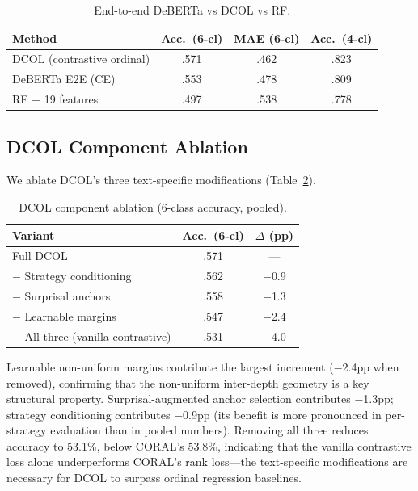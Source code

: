 \documentclass[11pt,a4paper]{article}
\begin{document}
\begin{table}[t]
\centering
\small
\caption{End-to-end DeBERTa vs DCOL vs RF.}
\label{tab:e2e}
\begin{tabular}{@{}lccc@{}}
\toprule
\textbf{Method} & \textbf{Acc.\ (6-cl)} & \textbf{MAE (6-cl)} & \textbf{Acc.\ (4-cl)} \\
\midrule
DCOL (contrastive ordinal) & .571 & .462 & .823 \\
DeBERTa E2E (CE) & .553 & .478 & .809 \\
RF + 19 features & .497 & .538 & .778 \\
\bottomrule
\end{tabular}
\end{table}

\subsection{DCOL Component Ablation}
\label{sec:ablation}

We ablate DCOL's three text-specific modifications (Table~\ref{tab:ablation}).

\begin{table}[t]
\centering
\small
\caption{DCOL component ablation (6-class accuracy, pooled).}
\label{tab:ablation}
\begin{tabular}{@{}lcc@{}}
\toprule
\textbf{Variant} & \textbf{Acc.\ (6-cl)} & \textbf{$\Delta$ (pp)} \\
\midrule
Full DCOL & .571 & --- \\
$-$ Strategy conditioning & .562 & $-$0.9 \\
$-$ Surprisal anchors & .558 & $-$1.3 \\
$-$ Learnable margins & .547 & $-$2.4 \\
$-$ All three (vanilla contrastive) & .531 & $-$4.0 \\
\bottomrule
\end{tabular}
\end{table}

Learnable non-uniform margins contribute the largest increment ($-$2.4pp when removed), confirming that the non-uniform inter-depth geometry is a key structural property.
Surprisal-augmented anchor selection contributes $-$1.3pp; strategy conditioning contributes $-$0.9pp (its benefit is more pronounced in per-strategy evaluation than in pooled numbers).
Removing all three reduces accuracy to 53.1\%, below CORAL's 53.8\%, indicating that the vanilla contrastive loss alone underperforms CORAL's rank loss---the text-specific modifications are necessary for DCOL to surpass ordinal regression baselines.
\end{document}
